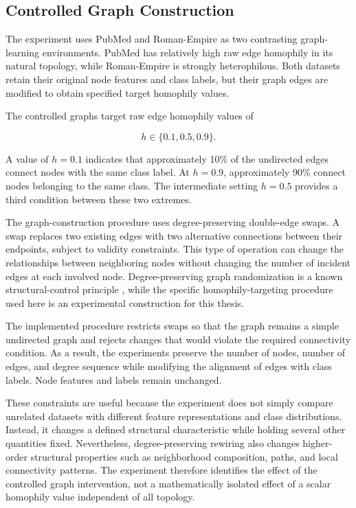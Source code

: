\documentclass[english]{lni}
\begin{document}
\subsection{Controlled Graph Construction}
\label{sec:controlled-graph-construction}

The experiment uses PubMed and Roman-Empire as two contrasting graph-learning environments. PubMed has relatively high raw edge homophily in its natural topology, while Roman-Empire is strongly heterophilous. Both datasets retain their original node features and class labels, but their graph edges are modified to obtain specified target homophily values.

The controlled graphs target raw edge homophily values of

\[
h\in\{0.1,0.5,0.9\}.
\]

A value of $h=0.1$ indicates that approximately 10\% of the undirected edges connect nodes with the same class label. At $h=0.9$, approximately 90\% connect nodes belonging to the same class. The intermediate setting $h=0.5$ provides a third condition between these two extremes.

The graph-construction procedure uses degree-preserving double-edge swaps. A swap replaces two existing edges with two alternative connections between their endpoints, subject to validity constraints. This type of operation can change the relationships between neighboring nodes without changing the number of incident edges at each involved node. Degree-preserving graph randomization is a known structural-control principle \cite{maslov2002specificity}, while the specific homophily-targeting procedure used here is an experimental construction for this thesis.

The implemented procedure restricts swaps so that the graph remains a simple undirected graph and rejects changes that would violate the required connectivity condition. As a result, the experiments preserve the number of nodes, number of edges, and degree sequence while modifying the alignment of edges with class labels. Node features and labels remain unchanged.

These constraints are useful because the experiment does not simply compare unrelated datasets with different feature representations and class distributions. Instead, it changes a defined structural characteristic while holding several other quantities fixed. Nevertheless, degree-preserving rewiring also changes higher-order structural properties such as neighborhood composition, paths, and local connectivity patterns. The experiment therefore identifies the effect of the controlled graph intervention, not a mathematically isolated effect of a scalar homophily value independent of all topology.
\end{document}
